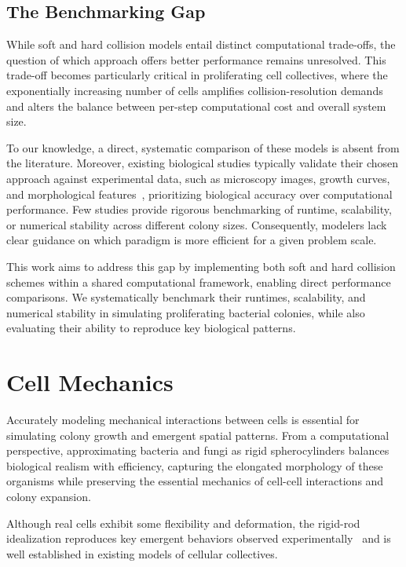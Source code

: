 \documentclass[conference]{IEEEtran}
\begin{document}
\subsection{The Benchmarking Gap}

While soft and hard collision models entail distinct computational trade-offs, the question of which approach offers better performance remains unresolved. This trade-off becomes particularly critical in proliferating cell collectives, where the exponentially increasing number of cells amplifies collision-resolution demands and alters the balance between per-step computational cost and overall system size.

To our knowledge, a direct, systematic comparison of these models is absent from the literature. Moreover, existing biological studies typically validate their chosen approach against experimental data, such as microscopy images, growth curves, and morphological features~\cite{Rudge2012,Weady2024,Blanchard2015,Ghosh2015,You2018,Warren2019,Khan_2024,You_2021,Valdez2025,Rudge2013,Langeslay_2023}, prioritizing biological accuracy over computational performance. Few studies provide rigorous benchmarking of runtime, scalability, or numerical stability across different colony sizes. Consequently, modelers lack clear guidance on which paradigm is more efficient for a given problem scale.

This work aims to address this gap by implementing both soft and hard collision schemes within a shared computational framework, enabling direct performance comparisons. We systematically benchmark their runtimes, scalability, and numerical stability in simulating proliferating bacterial colonies, while also evaluating their ability to reproduce key biological patterns.

\section{Cell Mechanics}

Accurately modeling mechanical interactions between cells is essential for simulating colony growth and emergent spatial patterns. From a computational perspective, approximating bacteria and fungi as rigid spherocylinders balances biological realism with efficiency, capturing the elongated morphology of these organisms while preserving the essential mechanics of cell-cell interactions and colony expansion.

Although real cells exhibit some flexibility and deformation, the rigid-rod idealization reproduces key emergent behaviors observed experimentally~\cite{Rudge2012,Khan_2024,Rudge2013,Langeslay_2023,Ghosh2015} and is well established in existing models of cellular collectives.
\end{document}
